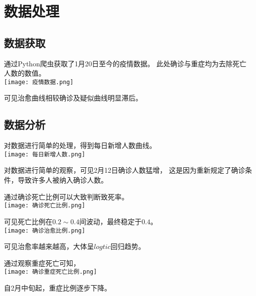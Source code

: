 \section{数据处理}
\subsection{数据获取}
通过Python爬虫获取了1月20日至今的疫情数据。
此处确诊与重症均为去除死亡人数的数值。
\\
\texttt{[image: 疫情数据.png]}
\par
可见治愈曲线相较确诊及疑似曲线明显滞后。
\subsection{数据分析}
对数据进行简单的处理，得到每日新增人数曲线。
\\
\texttt{[image: 每日新增人数.png]}
\par
对数据进行简单的观察，可见2月12日确诊人数猛增，
这是因为重新规定了确诊条件，导致许多人被纳入确诊人数。
\par
通过确诊死亡比例可以大致判断致死率。
\\
\texttt{[image: 确诊死亡比例.png]}
\par
可见死亡比例在$0.2\sim 0.4$间波动，最终稳定于$0.4$。
\\
\texttt{[image: 确诊治愈比例.png]}
\par
可见治愈率越来越高，大体呈$logtic$回归趋势。
\par
通过观察重症死亡可知，
\\
\texttt{[image: 确诊重症死亡比例.png]}
\par
自2月中旬起，重症比例逐步下降。
